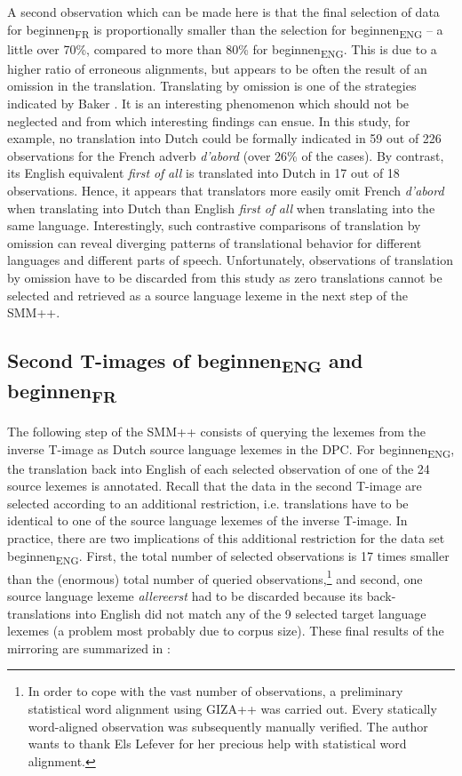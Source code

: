 A second observation which can be made here is that the final selection of data for beginnen\textsubscript{FR} is proportionally smaller than the selection for beginnen\textsubscript{ENG} – a little over 70\%, compared to more than 80\% for beginnen\textsubscript{ENG}. This is due to a higher ratio of erroneous alignments, but appears to be often the result of an omission in the translation. Translating by omission is one of the strategies indicated by Baker \citep[40]{baker_other_1992}. It is an interesting phenomenon which should not be neglected and from which interesting findings can ensue. In this study, for example, no translation into Dutch could be formally indicated in 59 out of 226 observations for the French adverb \textit{d’abord} (over 26\% of the cases). By contrast, its English equivalent \textit{first} \textit{of} \textit{all} is translated into Dutch in 17 out of 18 observations. Hence, it appears that translators more easily omit French \textit{d’abord} when translating into Dutch than English \textit{first} \textit{of} \textit{all} when translating into the same language. Interestingly, such contrastive comparisons of translation by omission can reveal diverging patterns of translational behavior for different languages and different parts of speech. Unfortunately, observations of translation by omission have to be discarded from this study as zero translations cannot be selected and retrieved as a source language lexeme in the next step of the SMM++.


\subsection{Second T-images of beginnen\textsubscript{ENG}\textsubscript{} and beginnen\textsubscript{FR}}
\label{sec:3.6.3}
The following step of the SMM++ consists of querying the lexemes from the inverse T-image as Dutch source language lexemes in the DPC. For beginnen\textsubscript{ENG}, the translation back into English of each selected observation of one of the 24 source lexemes is annotated. Recall that the data in the second T-image are selected according to an additional restriction, i.e. translations have to be identical to one of the source language lexemes of the inverse T-image. In practice, there are two implications of this additional restriction for the data set beginnen\textsubscript{ENG}. First, the total number of selected observations is 17 times smaller than the (enormous) total number of queried observations,\footnote{In order to cope with the vast number of observations, a preliminary statistical word alignment using GIZA++ was carried out. Every statically word-aligned observation was subsequently manually verified. The author wants to thank Els Lefever for her precious help with statistical word alignment.} and second, one source language lexeme \textit{allereerst} had to be discarded because its back-translations into English did not match any of the 9 selected target language lexemes (a problem most probably due to corpus size). These final results of the mirroring are summarized in :

